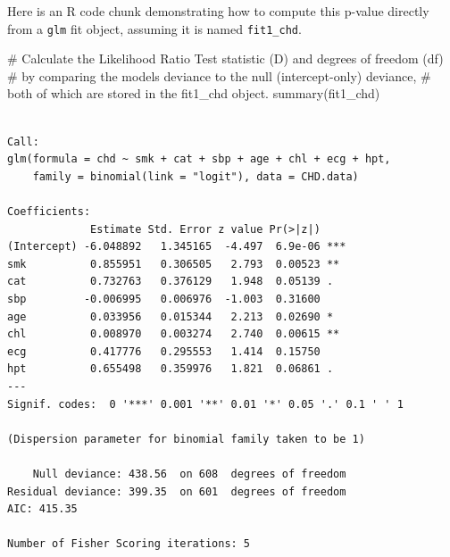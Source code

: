 \documentclass[
  letterpaper,
]{scrbook}
\newenvironment{Shaded}{\begin{snugshade}}{\end{snugshade}}
\newcommand{\CommentTok}[1]{\textcolor[rgb]{0.37,0.37,0.37}{#1}}
\newcommand{\FunctionTok}[1]{\textcolor[rgb]{0.28,0.35,0.67}{#1}}
\newcommand{\NormalTok}[1]{\textcolor[rgb]{0.00,0.23,0.31}{#1}}
\begin{document}
Here is an R code chunk demonstrating how to compute this p-value
directly from a \texttt{glm} fit object, assuming it is named
\texttt{fit1\_chd}.

\begin{Shaded}
\begin{Highlighting}[]
\CommentTok{\# Calculate the Likelihood Ratio Test statistic (D) and degrees of freedom (df)}
\CommentTok{\# by comparing the model\textquotesingle{}s deviance to the null (intercept{-}only) deviance,}
\CommentTok{\# both of which are stored in the \textquotesingle{}fit1\_chd\textquotesingle{} object.}
\FunctionTok{summary}\NormalTok{(fit1\_chd)}
\end{Highlighting}
\end{Shaded}

\begin{verbatim}

Call:
glm(formula = chd ~ smk + cat + sbp + age + chl + ecg + hpt, 
    family = binomial(link = "logit"), data = CHD.data)

Coefficients:
             Estimate Std. Error z value Pr(>|z|)    
(Intercept) -6.048892   1.345165  -4.497  6.9e-06 ***
smk          0.855951   0.306505   2.793  0.00523 ** 
cat          0.732763   0.376129   1.948  0.05139 .  
sbp         -0.006995   0.006976  -1.003  0.31600    
age          0.033956   0.015344   2.213  0.02690 *  
chl          0.008970   0.003274   2.740  0.00615 ** 
ecg          0.417776   0.295553   1.414  0.15750    
hpt          0.655498   0.359976   1.821  0.06861 .  
---
Signif. codes:  0 '***' 0.001 '**' 0.01 '*' 0.05 '.' 0.1 ' ' 1

(Dispersion parameter for binomial family taken to be 1)

    Null deviance: 438.56  on 608  degrees of freedom
Residual deviance: 399.35  on 601  degrees of freedom
AIC: 415.35

Number of Fisher Scoring iterations: 5
\end{verbatim}
\end{document}
